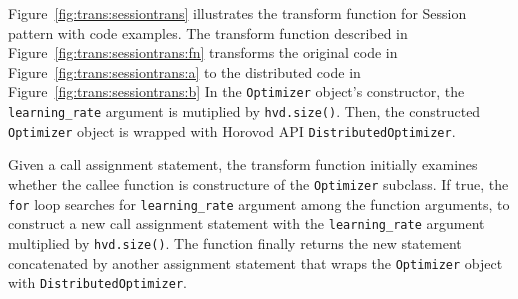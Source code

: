 \noindent

\begin{inred}
Figure~\ref{fig:trans:sessiontrans} illustrates the transform function for
Session pattern with code examples.
The transform function described in Figure~\ref{fig:trans:sessiontrans:fn}
transforms the original code in Figure~\ref{fig:trans:sessiontrans:a} to
the distributed code in Figure~\ref{fig:trans:sessiontrans:b}
In the {\tt Optimizer} object's constructor,
the {\tt learning\_rate} argument is mutiplied by {\tt hvd.size()}.
Then, the constructed {\tt Optimizer} object
is wrapped with Horovod API {\tt DistributedOptimizer}.

Given a call assignment statement,
the transform function initially examines whether the callee function
is constructure of the {\tt Optimizer} subclass.
If true, the {\tt for} loop searches for
{\tt learning\_rate} argument among the function arguments,
to construct a new call assignment statement 
with the {\tt learning\_rate} argument multiplied by {\tt hvd.size()}.
The function finally returns the new statement
concatenated by another assignment statement
that wraps the {\tt Optimizer} object with {\tt DistributedOptimizer}.

\end{inred}




